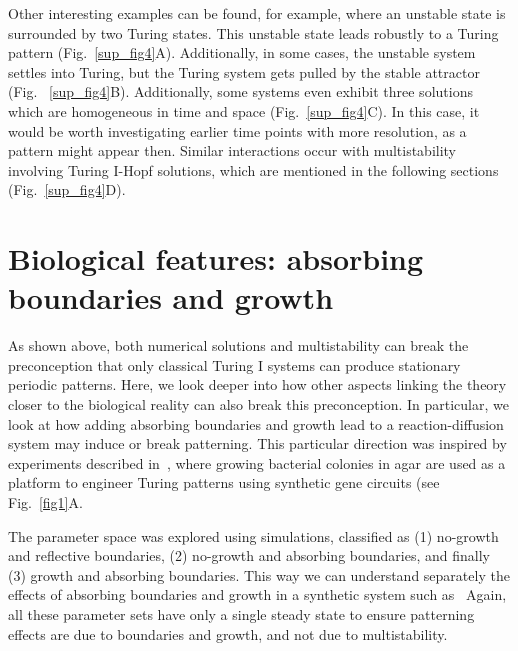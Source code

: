Other interesting examples can be found, for example, where an unstable state is surrounded by two Turing states. This unstable state leads robustly to a Turing pattern (Fig.~\ref{sup_fig4}A).
Additionally, in some cases, the unstable system settles into Turing, but the Turing system gets pulled by the stable attractor (Fig. ~\ref{sup_fig4}B). Additionally, some systems even exhibit three solutions which are homogeneous in time and space (Fig.~\ref{sup_fig4}C). In this case, it would be worth investigating earlier time points with more resolution, as a pattern might appear then.
Similar interactions occur with multistability involving Turing I-Hopf solutions, which are mentioned in the following sections (Fig.~\ref{sup_fig4}D).




\section{Biological features: absorbing boundaries and growth}
As shown above, both numerical solutions and multistability can break the preconception that only classical Turing I systems can produce stationary periodic patterns.
Here, we look deeper into how other aspects linking the theory closer to the biological reality can also break this preconception.
In particular, we look at how adding absorbing boundaries and growth lead to a reaction-diffusion system may induce or break patterning.
This particular direction was inspired by experiments described in~\parencite{Oliver2023}, where growing bacterial colonies in agar are used as a platform to engineer Turing patterns using synthetic gene circuits (see Fig.~\ref{fig1}A.

The parameter space was explored using simulations, classified as  (1) no-growth and reflective boundaries, (2) no-growth and absorbing boundaries, and finally (3) growth and absorbing boundaries. This way we can understand separately the effects of absorbing boundaries and growth in a synthetic system such as~\parencite{Oliver2023}
Again, all these parameter sets have only a single steady state to ensure patterning effects are due to boundaries and growth, and not due to multistability.

